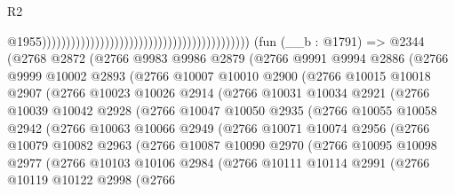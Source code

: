 \begin{lexlean}{R2}
\begin{coremodule}
                                                                                          @1955)))))))))))))))))))))))))))))))))))))))))))
    (fun (__b : @1791) =>
    @2344
      (@2768
        @2872
        (@2766
          @9983
          @9986
          @2879
          (@2766
            @9991
            @9994
            @2886
            (@2766
              @9999
              @10002
              @2893
              (@2766
                @10007
                @10010
                @2900
                (@2766
                  @10015
                  @10018
                  @2907
                  (@2766
                    @10023
                    @10026
                    @2914
                    (@2766
                      @10031
                      @10034
                      @2921
                      (@2766
                        @10039
                        @10042
                        @2928
                        (@2766
                          @10047
                          @10050
                          @2935
                          (@2766
                            @10055
                            @10058
                            @2942
                            (@2766
                              @10063
                              @10066
                              @2949
                              (@2766
                                @10071
                                @10074
                                @2956
                                (@2766
                                  @10079
                                  @10082
                                  @2963
                                  (@2766
                                    @10087
                                    @10090
                                    @2970
                                    (@2766
                                      @10095
                                      @10098
                                      @2977
                                      (@2766
                                        @10103
                                        @10106
                                        @2984
                                        (@2766
                                          @10111
                                          @10114
                                          @2991
                                          (@2766
                                            @10119
                                            @10122
                                            @2998
                                            (@2766

\end{coremodule}
\end{lexlean}
